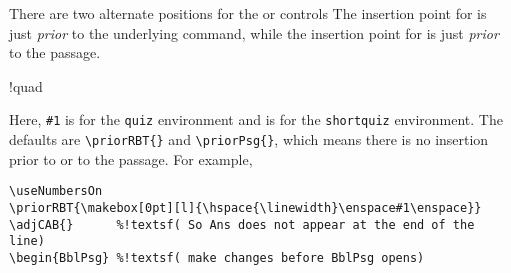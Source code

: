 \documentclass{article}
\edef\amtIndent{\the\parindent}
\let\env\texttt
\begin{document}
There are two alternate positions for the  or 
controls The insertion point for  is just \emph{prior} to the underlying
 command, while the insertion point for  is just \emph{prior}
to the passage.
\bVerb{}%
\def\1{\rlap{\hskip\linewidth\textsf{(positions \cs{CorrAnsButton} or \cs{sqTallyBox})}}}%
\begin{dCmd}[commandchars=!()]{\bxSize}
!quad
\end{dCmd}
\eVerb Here, \texttt{\#1} is  for the \env{quiz}
environment and is  for the \env{shortquiz} environment. The
defaults are \verb!\priorRBT{}! and \verb~\priorPsg{}~, which means there is
no insertion prior to  or to the passage.  For example,
\begin{Verbatim}[xleftmargin=\amtIndent,commandchars=!()]
\useNumbersOn
\priorRBT{\makebox[0pt][l]{\hspace{\linewidth}\enspace#1\enspace}}
\adjCAB{}      %!textsf( So Ans does not appear at the end of the line)
\begin{BblPsg} %!textsf( make changes before BblPsg opens)
\end{Verbatim}
\end{document}
